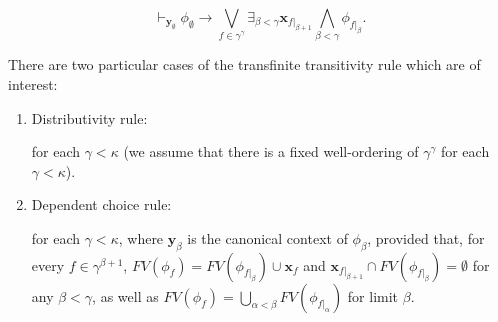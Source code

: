 \documentclass[a4paper,11pt]{article}
\theoremstyle{plain}
\theoremstyle{plain}
\theoremstyle{remark}
\begin{document}
$$\vdash_{\mathbf{y}_{\emptyset}} \phi_{\emptyset} \to \bigvee_{f \in \gamma^{\gamma}} \exists_{\beta<\gamma}\mathbf{x}_{f|_{\beta +1}} \bigwedge_{\beta<\gamma}\phi_{f|_{\beta}}.$$


There are two particular cases of the transfinite transitivity rule which are of interest:

\begin{enumerate}

\item Distributivity rule:

\begin{mathpar}
\end{mathpar}

for each $\gamma<\kappa$ (we assume that there is a fixed well-ordering of $\gamma^{\gamma}$ for each $\gamma<\kappa$).
 

\item Dependent choice rule:

\begin{mathpar}
\end{mathpar}

for each $\gamma < \kappa$, where $\mathbf{y}_{\beta}$ is the canonical context of $\phi_{\beta}$, provided that, for every $f \in \gamma^{\beta+1}$,  $FV(\phi_{f}) = FV(\phi_{f|_{\beta}}) \cup \mathbf{x}_{f}$ and $\mathbf{x}_{f|_{\beta +1}} \cap FV(\phi_{f|_{\beta}})= \emptyset$ for any $\beta<\gamma$, as well as $FV(\phi_{f}) = \bigcup_{\alpha<\beta} FV(\phi_{f|_{\alpha}})$ for limit $\beta$.

\end{enumerate}
\end{document}

